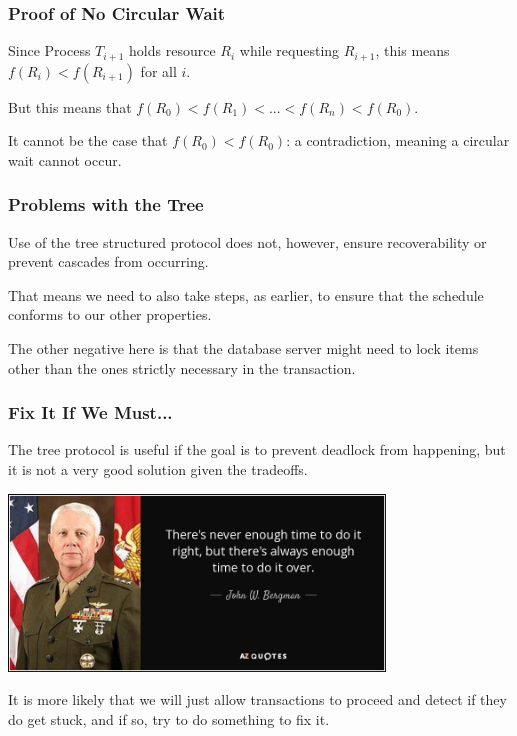 \begin{frame}
\frametitle{Proof of No Circular Wait}


Since Process $T_{i+1}$ holds resource $R_{i}$ while requesting $R_{i+1}$, this means $f(R_{i}) < f(R_{i+1})$ for all $i$. 

But this means that $f(R_{0}) < f(R_{1}) < ... < f(R_{n}) < f(R_{0})$. 

It cannot be the case that $f(R_{0}) < f(R_{0})$: a contradiction, meaning a circular wait cannot occur.


\end{frame}

\begin{frame}
\frametitle{Problems with the Tree}

Use of the tree structured protocol does not, however, ensure recoverability or prevent cascades from occurring. 

That means we need to also take steps, as earlier, to ensure that the schedule conforms to our other properties. 

The other negative here is that the database server might need to lock items other than the ones strictly necessary in the transaction.


\end{frame}

\begin{frame}
\frametitle{Fix It If We Must...}

The tree protocol is useful if the goal is to prevent deadlock from happening, but it is not a very good solution given the tradeoffs.

\begin{center}
	\includegraphics[width=0.75\textwidth]{images/doitover.jpg}
\end{center}

It is more likely that we will just allow transactions to proceed and detect if they do get stuck, and if so, try to do something to fix it.



\end{frame}




